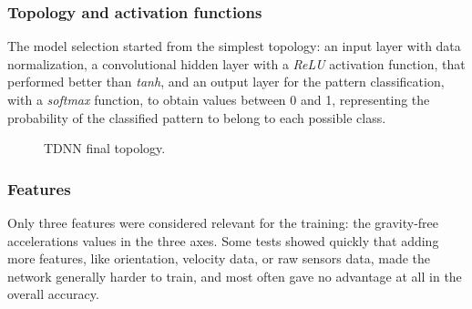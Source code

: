 \subsubsection{Topology and activation functions}
The model selection started from the simplest topology: an input layer with data normalization, a convolutional hidden layer with a \textit{ReLU} activation function, that performed better than \textit{tanh}, and an output layer for the pattern classification, with a \textit{softmax} function, to obtain values between 0 and 1, representing the probability of the classified pattern to belong to each possible class.
\bigbreak

\begin{center}
	\begin{figure}[ht!]
		\caption{TDNN final topology.}
	\end{figure}
\end{center}

\subsubsection{Features}
Only three features were considered relevant for the training: the gravity-free accelerations values in the three axes. Some tests showed quickly that adding more features, like orientation, velocity data, or raw sensors data, made the network generally harder to train, and most often gave no advantage at all in the overall accuracy.

